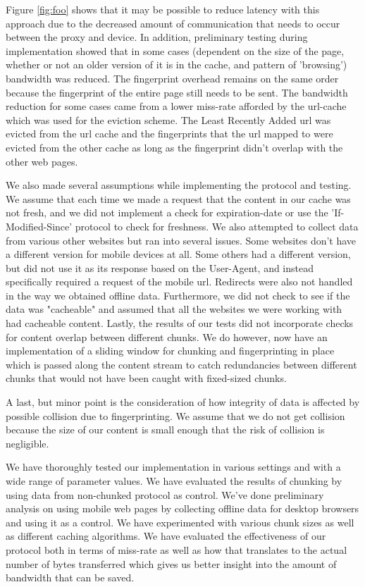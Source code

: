 Figure \ref{fig:foo} shows that it may be possible to reduce latency with this approach due to the decreased amount of communication that needs to occur between the proxy and device. In addition, preliminary testing during implementation showed that in some cases (dependent on the size of the page, whether or not an older version of it is in the cache, and pattern of 'browsing') bandwidth was reduced. The fingerprint overhead remains on the same order because the fingerprint of the entire page still needs to be sent. The bandwidth reduction for some cases came from a lower miss-rate afforded by the url-cache which was used for the eviction scheme. The Least Recently Added url was evicted from the url cache and the fingerprints that the url mapped to were evicted from the other cache as long as the fingerprint didn't overlap with the other web pages.

We also made several assumptions while implementing the protocol and testing. We assume that each time we made a request that the content in our cache was not fresh, and we did not implement a check for expiration-date or use the 'If-Modified-Since' protocol to check for freshness. We also attempted to collect data from various other websites but ran into several issues. Some websites don't have a different version for mobile devices at all. Some others had a different version, but did not use it as its response based on the User-Agent, and instead specifically required a request of the mobile url. Redirects were also not handled in the way we obtained offline data. Furthermore, we did not check to see if the data was "cacheable" and assumed that all the websites we were working with had cacheable content. Lastly, the results of our tests did not incorporate checks for content overlap between different chunks. We do however, now have an implementation of a sliding window for chunking and fingerprinting in place which is passed along the content stream to catch redundancies between different chunks that would not have been caught with fixed-sized chunks. 

A last, but minor point is the consideration of how integrity of data is affected by possible collision due to fingerprinting. We assume that we do not get collision because the size of our content is small enough that the risk of collision is negligible. 

We have thoroughly tested our implementation in various settings and with a wide range of parameter values. We have evaluated the results of chunking by using data from non-chunked protocol as control. We've done preliminary analysis on using mobile web pages by collecting offline data for desktop browsers and using it as a control. We have experimented with various chunk sizes as well as different caching algorithms. We have evaluated the effectiveness of our protocol both in terms of miss-rate as well as how that translates to the actual number of bytes transferred which gives us better insight into the amount of bandwidth that can be saved. 

